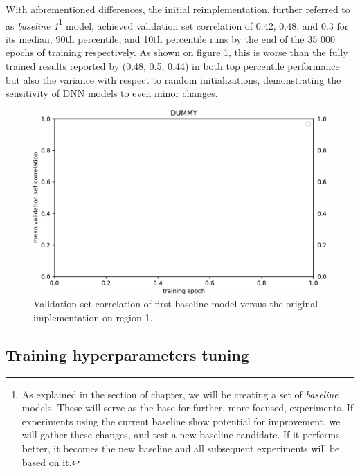 With aforementioned differences, the initial reimplementation, further referred to as \emph{baseline 1}\footnote{As explained in the  section of  chapter, we will be creating a set of \emph{baseline} models. These will serve as the base for further, more focused, experiments. If experiments using the current baseline show potential for improvement, we will gather these changes, and test a new baseline candidate. If it performs better, it becomes the new baseline and all subsequent experiments will be based on it.} model, achieved validation set correlation of 0.42, 0.48, and 0.3 for its median, 90th percentile, and 10th percentile runs by the end of the 35 000 epochs of training respectively. As shown on figure \ref{fig:5.1.1.1}, this is worse than the fully trained results reported by \citeauthor{antolik} (0.48, 0.5, 0.44) in both top percentile performance but also the variance with respect to random initializations, demonstrating the sensitivity of DNN models to even minor changes.

\begin{figure}[H]
    \centering
    \includegraphics[width=1\textwidth]{../figures/05_dummy}
    \caption[Experiment 5.1.1.1]{Validation set correlation of first baseline model versus the original \cite{antolik} implementation on region 1\protect\footnotemark.}
    \label{fig:5.1.1.1}
\end{figure}

\subsection{Training hyperparameters tuning}
